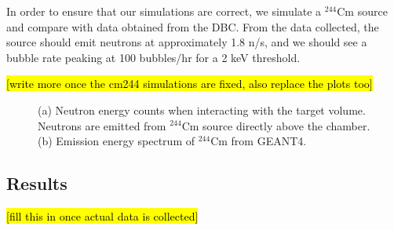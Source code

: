 \documentclass[%
12pt,
twoside,
reprint,
amsmath,amssymb,
aps,
]{article}
\begin{document}
	\par In order to ensure that our simulations are correct, we simulate a $^{244}$Cm source and compare with data obtained from the DBC. From the data collected, the source should emit neutrons at approximately 1.8 n/s, and we should see a bubble rate peaking at 100 bubbles/hr for a 2 keV threshold.
	
	\noindent \hl{[write more once the cm244 simulations are fixed, also replace the plots too]}

	\begin{figure}[H]%
		\centering
		\qquad
		\caption{\label{tab:table-name} (a) Neutron energy counts when interacting with the target volume. Neutrons are emitted from $^{244}$Cm source directly above the chamber. (b) Emission energy spectrum of $^{244}$Cm from GEANT4.}%
	\end{figure}

	\subsection{Results}
	\hl{[fill this in once actual data is collected]}
	
\end{document}
